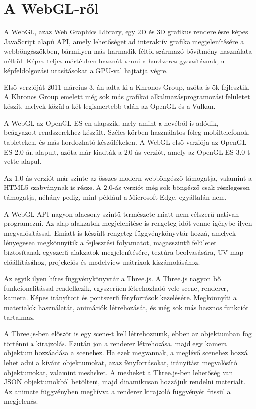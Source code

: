 
\section{A WebGL-ről}
A WebGL, azaz Web Graphics Library, egy 2D és 3D grafikus renderelésre képes JavaScript alapú API, amely lehetőséget ad interaktív grafika megjelenítésére a webböngészőkben, bármilyen más harmadik féltől származó bővítmény használata nélkül. Képes teljes mértékben hasznát venni a hardveres gyorsításnak, a képfeldolgozási utasításokat a GPU-val hajtatja végre. 

Első verzióját 2011 március 3.-án adta ki a Khronos Group, azóta is ők fejlesztik. A Khronos Group emelett még sok más grafikai alkalmazásprogramozási felületet készít, melyek közül a két legismertebb talán az OpenGL és a Vulkan.

A WebGL az OpenGL ES-en alapszik, mely amint a nevéből is adódik, beágyazott rendszerekhez készült. Széles körben használatos főleg mobiltelefonok, tableteken, és más hordozható készülékeken. A WebGL első verziója az OpenGL ES 2.0-án alapult, azóta már kiadták a 2.0-ás verziót, amely az OpenGL ES 3.0-t vette alapul.

Az 1.0-ás verziót már szinte az összes modern webböngésző támogatja, valamint a HTML5 szabványnak is része. A 2.0-ás verziót még sok böngésző csak részlegesen támogatja, néhány pedig, mint például a Microsoft Edge, egyáltalán nem.

A WebGL API nagyon alacsony szintű természete miatt nem célszerű natívan programozni. Az alap alakzatok megjelenítése is rengeteg időt venne igénybe ilyen megvalósítással. Emiatt is készült rengeteg függvénykönyvtár hozzá, amelyek lényegesen megkönnyítik a fejlesztési folyamatot, magasszintű felületet biztosítanak egyszerű alakzatok megjelenítésére, textúra beolvasására, UV map előállításához, projekciós és modelview mátrixok kiszámolásához.

Az egyik ilyen híres függvénykönyvtár a Three.js. A Three.js nagyon bő funkcionalitással rendelkezik, egyszerűen létrehozható vele scene, renderer, kamera. Képes irányított és pontszerű fényforrások kezelésére. Megkönnyíti a materialok használatát, animációk létrehozását, és még sok más hasznos funkciót tartalmaz.

A Three.js-ben először is egy scene-t kell létrehoznunk, ebben az objektumban fog történni a kirajzolás. Ezután jön a renderer létrehozása, majd egy kamera objektum hozzáadása a scenehez. Ha ezek megvannak, a meglévő scenehez hozzá lehet adni a kívánt objektumokat, azaz fényforrásokat, irányítást megvalósító objektumokat, valamint mesheket. A mesheket a Three.js-ben lehetőség van JSON objektumokból betölteni, majd dinamikusan hozzájuk rendelni materialt. Az animate függvényben meghívva a renderer kirajzoló függvényét frissül a megjelenés.
